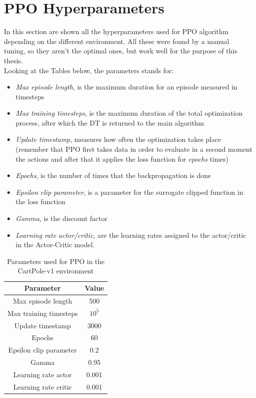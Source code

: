 \chapter{PPO Hyperparameters}
In this section are shown all the hyperparameters used for PPO algorithm depending on the different environment. All these were found by a manual tuning, so they aren't the optimal ones, but work well for the purpose of this thesis.\\Looking at the Tables below, the parameters stands for:
\begin{itemize}
    \item \textit{Max episode length}, is the maximum duration for an episode measured in timesteps
    \item \textit{Max training timesteps}, is the maximum duration of the total optimization process, after which the DT is returned to the main algorithm
    \item \textit{Update timestamp}, measures how often the optimization takes place (remember that PPO first takes data in order to evaluate in a second moment the actions and after that it applies the loss function for \textit{epochs} times)
    \item \textit{Epochs}, is the number of times that the backpropagation is done
    \item \textit{Epsilon clip parameter}, is a parameter for the surrogate clipped function in the loss function
    \item \textit{Gamma}, is the discount factor
    \item \textit{Learning rate actor/critic}, are the learning rates assigned to the actor/critic in the Actor-Critic model.
\end{itemize}

\begin{table}[h!]
\begin{center}
\begin{tabular}{ |c|c| } 
\hline
\textbf{Parameter} & \textbf{Value} \\
\hline
Max episode length & 500\\
Max training timesteps & $10^5$\\
Update timestamp & 3000\\
Epochs & 60\\
Epsilon clip parameter & 0.2\\
Gamma & 0.95\\
Learning rate actor & 0.001\\
Learning rate critic & 0.001\\
\hline
\end{tabular}
\caption{Parameters used for PPO in the CartPole-v1 environment}
\label{table:100}
\end{center}
\end{table}


